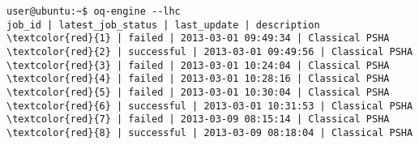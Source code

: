 \begin{Verbatim}[frame=single, commandchars=\\\{\}, fontsize=\small]
user@ubuntu:~$ oq-engine --lhc
job_id | latest_job_status | last_update | description
\textcolor{red}{1} | failed | 2013-03-01 09:49:34 | Classical PSHA
\textcolor{red}{2} | successful | 2013-03-01 09:49:56 | Classical PSHA
\textcolor{red}{3} | failed | 2013-03-01 10:24:04 | Classical PSHA
\textcolor{red}{4} | failed | 2013-03-01 10:28:16 | Classical PSHA
\textcolor{red}{5} | failed | 2013-03-01 10:30:04 | Classical PSHA
\textcolor{red}{6} | successful | 2013-03-01 10:31:53 | Classical PSHA
\textcolor{red}{7} | failed | 2013-03-09 08:15:14 | Classical PSHA
\textcolor{red}{8} | successful | 2013-03-09 08:18:04 | Classical PSHA
\end{Verbatim}